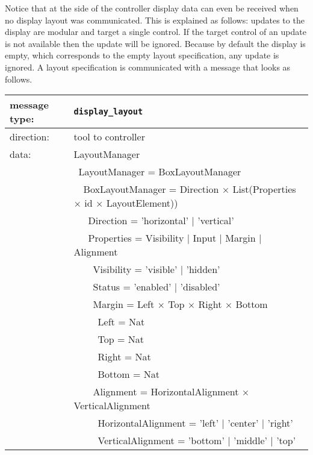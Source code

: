 \documentclass{article}
\newcommand{\msg}[1]{\texttt{#1}}
\begin{document}
   \noindent Notice that at the side of the controller display data can even be
   received when no display layout was communicated. This is explained as
   follows: updates to the display are modular and target a single control. If
   the target control of an update is not available then the update will be
   ignored. Because by default the display is empty, which corresponds to the
   empty layout specification, any update is ignored. A layout specification is
   communicated with a message that looks as follows.
   
   \begin{table}[H]
    \begin{center}
     \begin{tabular}{|ll|}
      \hline
       message type:   & \msg{display\_layout} \\
      \hline
       direction:      & tool to controller \\
       data:           & LayoutManager \\
                       & \ LayoutManager = BoxLayoutManager \\
                       & \ \ BoxLayoutManager = Direction $\times$ List(Properties $\times$ id $\times$ LayoutElement)) \\
                       & \ \ \ Direction = 'horizontal' $|$ 'vertical' \\
                       & \ \ \ Properties = Visibility $|$ Input $|$ Margin $|$ Alignment \\
                       & \ \ \ \ Visibility = 'visible' $|$ 'hidden' \\
                       & \ \ \ \ Status = 'enabled' $|$ 'disabled' \\
                       & \ \ \ \ Margin = Left $\times$ Top $\times$ Right $\times$ Bottom \\
                       & \ \ \ \ \ Left   = Nat \\
                       & \ \ \ \ \ Top    = Nat \\
                       & \ \ \ \ \ Right  = Nat \\
                       & \ \ \ \ \ Bottom = Nat \\
                       & \ \ \ \ Alignment = HorizontalAlignment $\times$ VerticalAlignment \\
                       & \ \ \ \ \ HorizontalAlignment = 'left' $|$ 'center' $|$ 'right' \\
                       & \ \ \ \ \ VerticalAlignment = 'bottom' $|$ 'middle' $|$ 'top' \\

\end{tabular}
\end{center}
\end{table}
\end{document}
